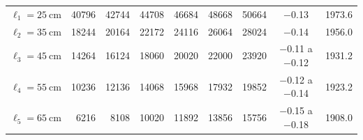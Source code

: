 \begin{table}[ht]
\begin{tabular}{@{}l *{6}{r} c r@{}}
\midrule
$\ell_{1}=\SI{25}{\centi\meter}$ & \num{40796} & \num{42744} & \num{44708} & \num{46684} & \num{48668} & \num{50664} & $-$0.13 & \num{1973.6} \\
$\ell_{2}=\SI{35}{\centi\meter}$ & \num{18244} & \num{20164} & \num{22172} & \num{24116} & \num{26064} & \num{28024} & $-$0.14 & \num{1956.0} \\
$\ell_{3}=\SI{45}{\centi\meter}$ & \num{14264} & \num{16124} & \num{18060} & \num{20020} & \num{22000} & \num{23920} & $-$0.11 a $-$0.12 & \num{1931.2} \\
$\ell_{4}=\SI{55}{\centi\meter}$ & \num{10236} & \num{12136} & \num{14068} & \num{15968} & \num{17932} & \num{19852} & $-$0.12 a $-$0.14 & \num{1923.2} \\
$\ell_{5}=\SI{65}{\centi\meter}$ & \num{6216} & \num{8108} & \num{10020} & \num{11892} & \num{13856} & \num{15756} & $-$0.15 a $-$0.18 & \num{1908.0} \\
\bottomrule
\end{tabular}
\end{table}

